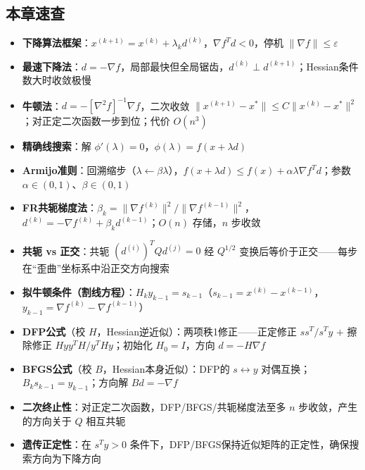 \subsection{本章速查}

\begin{itemize}
  \item \textbf{下降算法框架}：$x^{(k+1)} = x^{(k)} + \lambda_k d^{(k)}$，$\nabla f^T d < 0$，停机 $\|\nabla f\| \le \varepsilon$
  \item \textbf{最速下降法}：$d = -\nabla f$，局部最快但全局锯齿，$d^{(k)} \perp d^{(k+1)}$；Hessian条件数大时收敛极慢
  \item \textbf{牛顿法}：$d = -[\nabla^2 f]^{-1}\nabla f$，二次收敛 $\|x^{(k+1)}-x^*\| \le C\|x^{(k)}-x^*\|^2$；对正定二次函数一步到位；代价 $O(n^3)$
  \item \textbf{精确线搜索}：解 $\phi'(\lambda)=0$，$\phi(\lambda) = f(x+\lambda d)$
  \item \textbf{Armijo准则}：回溯缩步（$\lambda \leftarrow \beta\lambda$），$f(x+\lambda d) \le f(x) + \alpha\lambda\nabla f^T d$；参数 $\alpha\in(0,1)$、$\beta\in(0,1)$
  \item \textbf{FR共轭梯度法}：$\beta_k = \|\nabla f^{(k)}\|^2 / \|\nabla f^{(k-1)}\|^2$，$d^{(k)} = -\nabla f^{(k)} + \beta_k d^{(k-1)}$；$O(n)$ 存储，$n$ 步收敛
  \item \textbf{共轭 vs 正交}：共轭 $(d^{(i)})^T Q d^{(j)} = 0$ 经 $Q^{1/2}$ 变换后等价于正交——每步在“歪曲”坐标系中沿正交方向搜索
  \item \textbf{拟牛顿条件（割线方程）}：$H_k y_{k-1} = s_{k-1}$（$s_{k-1} = x^{(k)} - x^{(k-1)}$，$y_{k-1} = \nabla f^{(k)} - \nabla f^{(k-1)}$）
  \item \textbf{DFP公式}（校 $H$，Hessian逆近似）：两项秩1修正——正定修正 $ss^T/s^Ty$ $+$ 擦除修正 $Hyy^TH/y^THy$；初始化 $H_0 = I$，方向 $d = -H\nabla f$
  \item \textbf{BFGS公式}（校 $B$，Hessian本身近似）：DFP的 $s \leftrightarrow y$ 对偶互换；$B_k s_{k-1} = y_{k-1}$；方向解 $B d = -\nabla f$
  \item \textbf{二次终止性}：对正定二次函数，DFP/BFGS/共轭梯度法至多 $n$ 步收敛，产生的方向关于 $Q$ 相互共轭
  \item \textbf{遗传正定性}：在 $s^Ty > 0$ 条件下，DFP/BFGS保持近似矩阵的正定性，确保搜索方向为下降方向
\end{itemize}

\endinput
